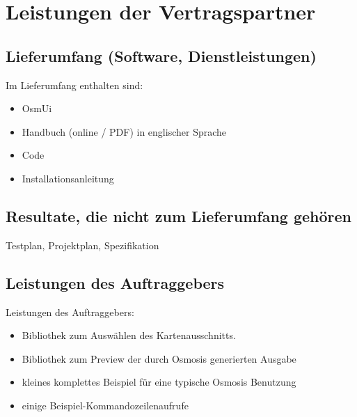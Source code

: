 \documentclass[a4paper,10pt]{scrartcl}
\begin{document}
\section{Leistungen der Vertragspartner}
\subsection{Lieferumfang (Software, Dienstleistungen)}
Im Lieferumfang enthalten sind:
\begin{itemize}
\item OsmUi
\item Handbuch (online / PDF) in englischer Sprache
\item Code
\item Installationsanleitung
\end{itemize}
\subsection{Resultate, die nicht zum Lieferumfang gehören}
Testplan, Projektplan, Spezifikation
\subsection{Leistungen des Auftraggebers}
Leistungen des Auftraggebers:
\begin{itemize}
\item Bibliothek zum Auswählen des Kartenausschnitts.
\item Bibliothek zum Preview der durch Osmosis generierten Ausgabe
\item kleines komplettes Beispiel für eine typische Osmosis Benutzung
\item einige Beispiel-Kommandozeilenaufrufe
\end{itemize}
\end{document}

